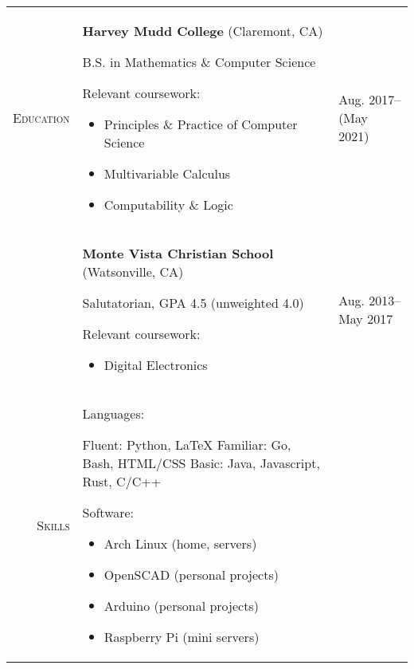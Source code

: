 \documentclass[8pt]{extarticle}
\makeatletter
\newcommand{\compress}{\@minipagetrue}
\newcommand{\location}[1]{(#1)}
\newcommand{\name}[1]{\textbf{#1}\hspace{1em}}
\newcommand{\cat}[1]{#1:}
\makeatother
\begin{document}
\begin{center}
\begin{tabularx}{\textwidth}{>{\scshape}r >{\compress}X | >{\footnotesize\scshape}l}

Education 

&

\name{Harvey Mudd College} \location{Claremont, CA}

B.S. in Mathematics \& Computer Science

\cat{Relevant coursework} 
\begin{itemize}
\item Principles \& Practice of Computer Science 
\item Multivariable Calculus
\item Computability \& Logic
\end{itemize}

&

Aug. 2017--(May 2021)

\\

&

\name{Monte Vista Christian School} \location{Watsonville, CA}

Salutatorian, GPA 4.5 (unweighted 4.0)

\cat{Relevant coursework}
\begin{multicols}{2}
\begin{itemize}
\item Digital Electronics
\end{itemize}
\end{multicols}

&

Aug. 2013--May 2017

\\

Skills

&

\cat{Languages}

Fluent: Python, \LaTeX
Familiar: Go, Bash, HTML/CSS
Basic: Java, Javascript, Rust, C/C++

\cat{Software} \compress
\begin{multicols}{2}
\begin{itemize}
\item Arch Linux (home, servers)
\item OpenSCAD (personal projects)
\item Arduino (personal projects)
\item Raspberry Pi (mini servers)
\end{itemize}
\end{multicols}


\end{tabularx}
\end{center}
\end{document}

